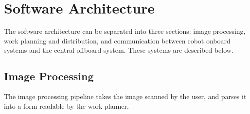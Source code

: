 
\section{Software Architecture}
\label{sec:software_architecture}
The software architecture can be separated into three sections: image processing, work planning and distribution, and communication between robot onboard systems and the central offboard system. These systems are described below.

\subsection{Image Processing}
\label{sec:sw_arch_image_processing}

The image processing pipeline takes the image scanned by the user, and parses it into a form readable by the work planner.
